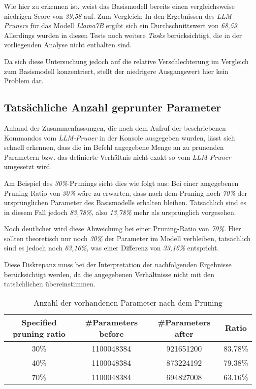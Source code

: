 Wie hier zu erkennen ist, weist das Basismodell bereits einen vergleichsweise
niedrigen Score von \emph{39,58} auf. Zum Vergleich: In den Ergebnissen des
\emph{LLM-Pruners} für das Modell \emph{Llama7B} ergibt sich ein
Durchschnittswert von \emph{68,59}. Allerdings wurden in diesen Tests noch
weitere \emph{Tasks} berücksichtigt, die in der vorliegenden Analyse nicht
enthalten sind.

Da sich diese Untersuchung jedoch auf die relative Verschlechterung im Vergleich
zum Basismodell konzentriert, stellt der niedrigere Ausgangswert hier kein
Problem dar.

\newpage

\subsection{Tatsächliche Anzahl geprunter Parameter}\label{param_count}

Anhand der Zusammenfassungen, die nach dem Aufruf der beschriebenen Kommandos
vom \emph{LLM-Pruner} in der Konsole ausgegeben wurden, lässt sich schnell
erkennen, dass die im Befehl angegebene Menge an zu prunenden Parametern bzw.
das definierte Verhältnis nicht exakt so vom \emph{LLM-Pruner} umgesetzt wird.

Am Beispiel des \emph{30\%}-Prunings sieht dies wie folgt aus: Bei einer
angegebenen Pruning-Ratio von \emph{30\%} wäre zu erwarten, dass nach dem
Pruning noch \emph{70\%} der ursprünglichen Parameter des Basismodells erhalten
bleiben. Tatsächlich sind es in diesem Fall jedoch \emph{83,78\%}, also
\emph{13,78\%} mehr als ursprünglich vorgesehen.

Noch deutlicher wird diese Abweichung bei einer Pruning-Ratio von \emph{70\%}.
Hier sollten theoretisch nur noch \emph{30\%} der Parameter im Modell
verbleiben, tatsächlich sind es jedoch noch \emph{63,16\%}, was einer Differenz
von \emph{33,16\%} entspricht.

Diese Diskrepanz muss bei der Interpretation der nachfolgenden Ergebnisse
berücksichtigt werden, da die angegebenen Verhältnisse nicht mit den
tatsächlichen übereinstimmen.

\begin{table}[h]
	\centering
	\begin{tabular}{c | c c | c }
		\toprule
		\textbf{Specified pruning ratio} & \textbf{\#Parameters before}
		                                 & \textbf{\#Parameters after}  & \textbf{Ratio}           \\
		\midrule
		30\%                             & 1100048384                   & 921651200      & 83.78\% \\
		40\%                             & 1100048384                   & 873224192      & 79.38\% \\
		70\%                             & 1100048384                   & 694827008      & 63.16\% \\
		\midrule
	\end{tabular}
	\caption{Anzahl der vorhandenen Parameter nach dem Pruning}
	\label{tab:parameters}
\end{table}

